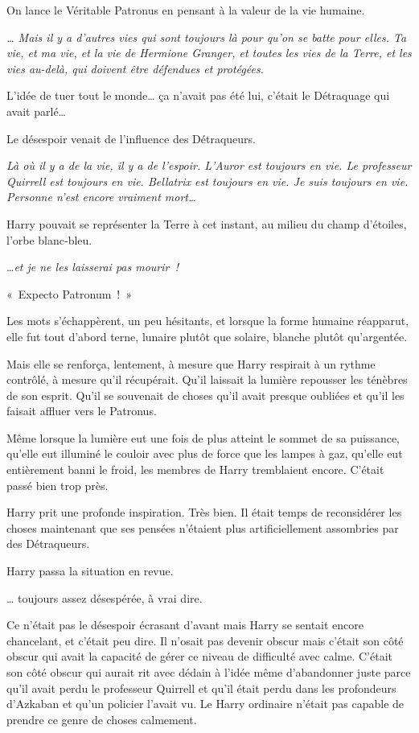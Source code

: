 On lance le Véritable Patronus en pensant à la valeur de la vie humaine.

\emph{… Mais il y a d'autres vies qui sont toujours là pour qu'on se batte pour elles. Ta vie, et ma vie, et la vie de Hermione Granger, et toutes les vies de la Terre, et les vies au-delà, qui doivent être défendues et protégées.}

L'idée de tuer tout le monde… ça n'avait pas été lui, c'était le Détraquage qui avait parlé…

Le désespoir venait de l'influence des Détraqueurs.

\emph{Là où il y a de la vie, il y a de l'espoir. L'Auror est toujours en vie. Le professeur Quirrell est toujours en vie. Bellatrix est toujours en vie. Je suis toujours en vie. Personne n'est encore vraiment mort…}

Harry pouvait se représenter la Terre à cet instant, au milieu du champ d'étoiles, l'orbe blanc-bleu.

…\emph{et je ne les laisserai pas mourir~!}

«~Expecto Patronum~!~»

Les mots s'échappèrent, un peu hésitants, et lorsque la forme humaine réapparut, elle fut tout d'abord terne, lunaire plutôt que solaire, blanche plutôt qu'argentée.

Mais elle se renforça, lentement, à mesure que Harry respirait à un rythme contrôlé, à mesure qu'il récupérait. Qu'il laissait la lumière repousser les ténèbres de son esprit. Qu'il se souvenait de choses qu'il avait presque oubliées et qu'il les faisait affluer vers le Patronus.

Même lorsque la lumière eut une fois de plus atteint le sommet de sa puissance, qu'elle eut illuminé le couloir avec plus de force que les lampes à gaz, qu'elle eut entièrement banni le froid, les membres de Harry tremblaient encore. C'était passé bien trop près.

Harry prit une profonde inspiration. Très bien. Il était temps de reconsidérer les choses maintenant que ses pensées n'étaient plus artificiellement assombries par des Détraqueurs.

Harry passa la situation en revue.

… toujours assez désespérée, à vrai dire.

Ce n'était pas le désespoir écrasant d'avant mais Harry se sentait encore chancelant, et c'était peu dire. Il n'osait pas devenir obscur mais c'était son côté obscur qui avait la capacité de gérer ce niveau de difficulté avec calme. C'était son côté obscur qui aurait rit avec dédain à l'idée même d'abandonner juste parce qu'il avait perdu le professeur Quirrell et qu'il était perdu dans les profondeurs d'Azkaban et qu'un policier l'avait vu. Le Harry ordinaire n'était pas capable de prendre ce genre de choses calmement.

